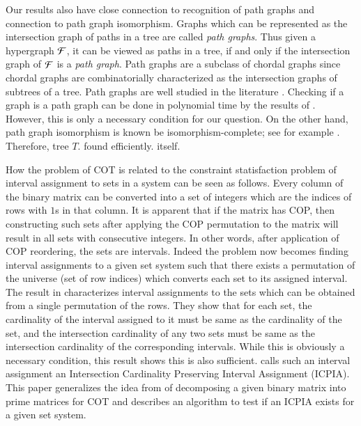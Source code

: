 \documentclass[MS,synopsis]{iitmdiss}
\begin{document}
Our results also have close connection to recognition of path graphs
and connection to path graph isomorphism.  Graphs which can be
represented as the intersection graph of paths in a tree are called
{\em path graphs}\cite{mcg04}. Thus given a hypergraph ${\cal F}$, it can
be viewed as paths in a tree, if and only if the intersection graph of
${\cal F}$ is a {\em path graph}. Path graphs are a subclass of chordal
graphs since chordal graphs are combinatorially characterized as the
intersection graphs of subtrees of a tree.  Path graphs are well
studied in the literature \cite{plr70,gav78,bp93,mcg04}.  Checking if
a graph is a path graph can be done in polynomial time by the results
of \cite{gav78,aas93}.  However, this is only a necessary condition
for our question.    On the other hand, path graph isomorphism is known
be isomorphism-complete; see for example \cite{kklv10}. Therefore,
 tree $T$.
 found efficiently.   itself.



How the problem of COT is related to the constraint statisfaction
problem of interval assignment to sets in a system can be seen as
follows. Every column of the binary matrix can be converted into a set
of integers which are the indices of rows with $1$s in that column. It
is apparent that if the matrix has COP, then constructing such sets
after applying the COP permutation to the matrix will result in all
sets with consecutive integers. In other words, after application of
COP reordering, the sets are intervals. Indeed the problem now becomes
finding interval assignments to a given set system such that there
exists a permutation of the universe (set of row indices) which
converts each set to its assigned interval. The result in
\cite{nsnrs09} characterizes interval assignments to the sets which
can be obtained from a single permutation of the rows.  They show that
for each set, the cardinality of the interval assigned to it must be
same as the cardinality of the set, and the intersection cardinality
of any two sets must be same as the intersection cardinality of the
corresponding intervals.  While this is obviously a necessary
condition, this result shows this is also sufficient.  \cite{nsnrs09}
calls such an interval assignment an Intersection Cardinality
Preserving Interval Assignment (ICPIA).  This paper generalizes the
idea from \cite{wlh02} of decomposing a given binary matrix into prime
matrices for COT and describes an algorithm to test if an ICPIA exists
for a given set system.
\end{document}
